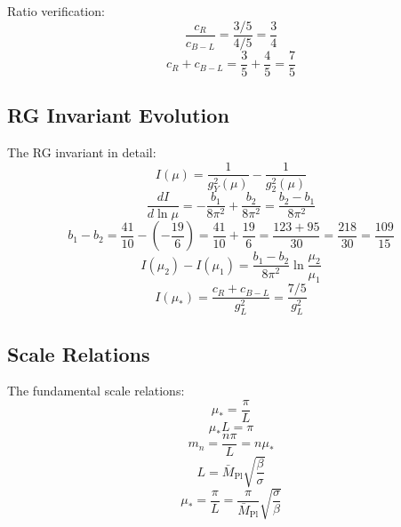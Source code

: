 \documentclass[11pt,a4paper]{article}
\begin{document}
Ratio verification:
\begin{equation}
\label{eq:ext-tr-7}
\frac{c_R}{c_{B-L}} = \frac{3/5}{4/5} = \frac{3}{4}
\end{equation}
\begin{equation}
\label{eq:ext-tr-8}
c_R + c_{B-L} = \frac{3}{5} + \frac{4}{5} = \frac{7}{5}
\end{equation}

\subsection*{RG Invariant Evolution}
\label{subsec:rg-inv-evolution}

The RG invariant in detail:
\begin{equation}
\label{eq:ext-I-1}
I(\mu) = \frac{1}{g_Y^2(\mu)} - \frac{1}{g_2^2(\mu)}
\end{equation}
\begin{equation}
\label{eq:ext-I-2}
\frac{dI}{d\ln\mu} = -\frac{b_1}{8\pi^2} + \frac{b_2}{8\pi^2} = \frac{b_2 - b_1}{8\pi^2}
\end{equation}
\begin{equation}
\label{eq:ext-I-3}
b_1 - b_2 = \frac{41}{10} - \left(-\frac{19}{6}\right) = \frac{41}{10} + \frac{19}{6} = \frac{123 + 95}{30} = \frac{218}{30} = \frac{109}{15}
\end{equation}
\begin{equation}
\label{eq:ext-I-4}
I(\mu_2) - I(\mu_1) = \frac{b_1 - b_2}{8\pi^2}\ln\frac{\mu_2}{\mu_1}
\end{equation}
\begin{equation}
\label{eq:ext-I-5}
I(\mu_*) = \frac{c_R + c_{B-L}}{g_L^2} = \frac{7/5}{g_L^2}
\end{equation}

\subsection*{Scale Relations}
\label{subsec:scale-relations}

The fundamental scale relations:
\begin{equation}
\label{eq:ext-scale-1}
\mu_* = \frac{\pi}{L}
\end{equation}
\begin{equation}
\label{eq:ext-scale-2}
\mu_* L = \pi
\end{equation}
\begin{equation}
\label{eq:ext-scale-3}
m_n = \frac{n\pi}{L} = n\mu_*
\end{equation}
\begin{equation}
\label{eq:ext-scale-4}
L = \bar{M}_{\text{Pl}}\sqrt{\frac{\beta}{\sigma}}
\end{equation}
\begin{equation}
\label{eq:ext-scale-5}
\mu_* = \frac{\pi}{L} = \frac{\pi}{\bar{M}_{\text{Pl}}}\sqrt{\frac{\sigma}{\beta}}
\end{equation}
\end{document}

